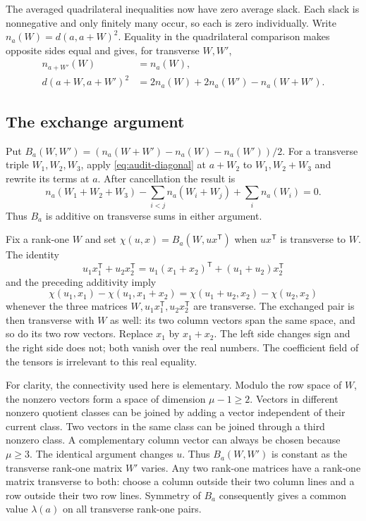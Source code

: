 The averaged quadrilateral inequalities now have zero average
slack. Each slack is nonnegative and only finitely many occur,
so each is zero individually.
Write $n_a(W)=d(a,a+W)^2$.
Equality in the quadrilateral comparison makes opposite sides
equal and gives, for transverse $W,W'$,
\begin{align}
 n_{a+W'}(W)&=n_a(W),\label{eq:audit-side}\\
 d(a+W,a+W')^2
 &=2n_a(W)+2n_a(W')-n_a(W+W').
 \label{eq:audit-diagonal}
\end{align}

\subsection{The exchange argument}

Put
$B_a(W,W')=(n_a(W+W')-n_a(W)-n_a(W'))/2$.
For a transverse triple $W_1,W_2,W_3$,
apply \eqref{eq:audit-diagonal} at $a+W_2$ to
$W_1,W_2+W_3$ and rewrite its terms at $a$.
After cancellation the result is
\[
 n_a(W_1+W_2+W_3)
 -\sum_{i<j}n_a(W_i+W_j)+\sum_i n_a(W_i)=0.
\]
Thus $B_a$ is additive on transverse sums in either argument.

Fix a rank-one $W$ and set
$\chi(u,x)=B_a(W,ux^{\mathsf T})$ when $ux^{\mathsf T}$
is transverse to $W$.
The identity
\[
 u_1x_1^{\mathsf T}+u_2x_2^{\mathsf T}
 =u_1(x_1+x_2)^{\mathsf T}
       +(u_1+u_2)x_2^{\mathsf T}
\]
and the preceding additivity imply
\[
 \chi(u_1,x_1)-\chi(u_1,x_1+x_2)
 =\chi(u_1+u_2,x_2)-\chi(u_2,x_2)
\]
whenever the three matrices $W,u_1x_1^{\mathsf T},u_2x_2^{\mathsf T}$
are transverse. The exchanged pair is then transverse with $W$
as well: its two column vectors span the same space, and so do
its two row vectors.
Replace $x_1$ by $x_1+x_2$.
The left side changes sign and the right side does not;
both vanish over the real numbers.
The coefficient field of the tensors is irrelevant to this
real equality.

For clarity, the connectivity used here is elementary.
Modulo the row space of $W$, the nonzero vectors form a
space of dimension $\mu-1\geq2$.
Vectors in different nonzero quotient classes can be joined
by adding a vector independent of their current class.
Two vectors in the same class can be joined through a
third nonzero class. A complementary column vector can
always be chosen because $\mu\geq3$.
The identical argument changes $u$.
Thus $B_a(W,W')$ is constant as the transverse rank-one
matrix $W'$ varies.
Any two rank-one matrices have a rank-one matrix transverse
to both: choose a column outside their two column lines and
a row outside their two row lines.
Symmetry of $B_a$ consequently gives a common value
$\lambda(a)$ on all transverse rank-one pairs.

